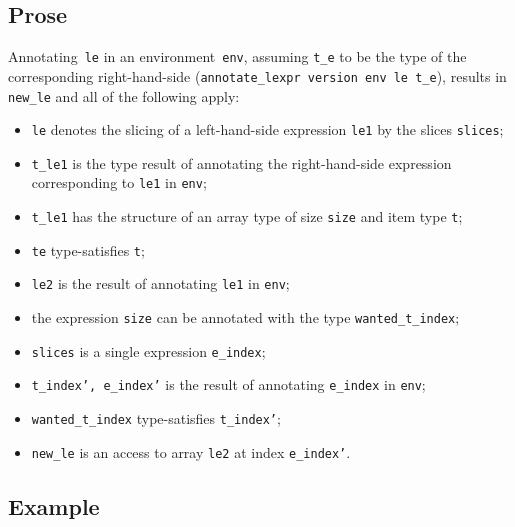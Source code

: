 \documentclass{book}
\begin{document}
  \subsection{Prose}
   Annotating~\texttt{le} in an environment~\texttt{env}, assuming
\texttt{t\_e} to be the type of the corresponding right-hand-side
(\texttt{annotate\_lexpr version env le t\_e}), results in \texttt{new\_le} and
all of the following apply:
   \begin{itemize}
   \item \texttt{le} denotes the slicing of a left-hand-side expression \texttt{le1} by the slices \texttt{slices};
   \item \texttt{t\_le1} is the type result of annotating the right-hand-side expression corresponding to \texttt{le1} in \texttt{env};
   \item \texttt{t\_le1} has the structure of an array type of size \texttt{size} and item type \texttt{t};
   \item \texttt{te} type-satisfies \texttt{t};
   \item \texttt{le2} is the result of annotating \texttt{le1} in \texttt{env};
  \item the expression \texttt{size} can be annotated with the type \texttt{wanted\_t\_index};
  \item \texttt{slices} is a single expression \texttt{e\_index};
   \item \texttt{t\_index', e\_index'} is the result of annotating \texttt{e\_index} in \texttt{env};
   \item \texttt{wanted\_t\_index} type-satisfies \texttt{t\_index'};
   \item \texttt{new\_le} is an access to array \texttt{le2} at index \texttt{e\_index'}.
   \end{itemize}

  \subsection{Example}
\end{document}
